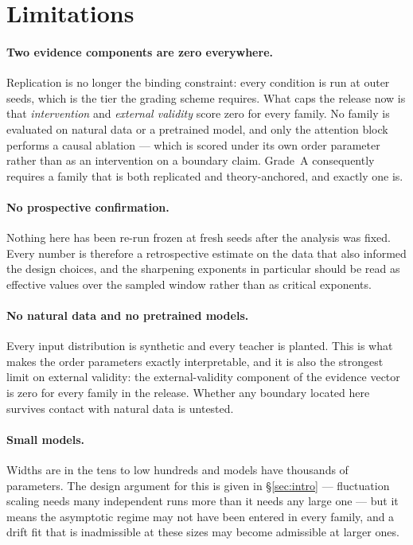 \section{Limitations}
\label{sec:limitations}

\paragraph{Two evidence components are zero everywhere.}
Replication is no longer the binding constraint: every condition is run at
\AtlasSpecializationSeeds{} outer seeds, which is the tier the grading scheme
requires. What caps the release now is that \emph{intervention} and
\emph{external validity} score zero for every family. No family is evaluated on
natural data or a pretrained model, and only the attention block performs a
causal ablation --- which is scored under its own order parameter rather than as
an intervention on a boundary claim. Grade~A consequently requires a family that
is both replicated and theory-anchored, and exactly one is.

\paragraph{No prospective confirmation.}
Nothing here has been re-run frozen at fresh seeds after the analysis was
fixed. Every number is therefore a retrospective estimate on the data that
also informed the design choices, and the sharpening exponents in particular
should be read as effective values over the sampled window rather than as
critical exponents.

\paragraph{No natural data and no pretrained models.}
Every input distribution is synthetic and every teacher is planted. This is
what makes the order parameters exactly interpretable, and it is also the
strongest limit on external validity: the external-validity component of the
evidence vector is zero for every family in the release. Whether any boundary
located here survives contact with natural data is untested.

\paragraph{Small models.}
Widths are in the tens to low hundreds and models have thousands of parameters.
The design argument for this is given in \S\ref{sec:intro} --- fluctuation
scaling needs many independent runs more than it needs any large one --- but it
means the asymptotic regime may not have been entered in every family, and a
drift fit that is inadmissible at these sizes may become admissible at larger
ones.

